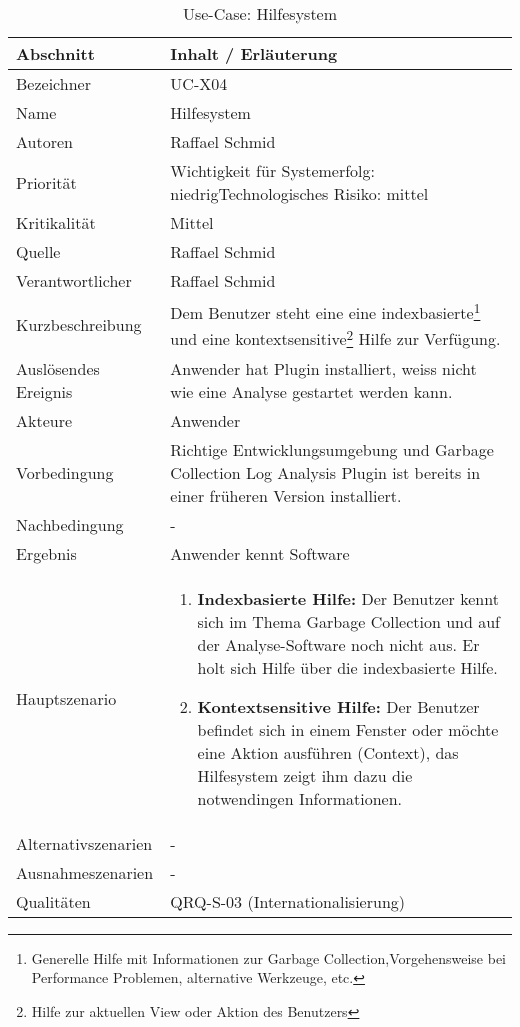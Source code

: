 \begin{longtable}{|p{4cm}|p{10.5cm}|}
\caption{Use-Case: Hilfesystem}\\\hline
   \textbf{Abschnitt} & \textbf{Inhalt / Erläuterung} \\\hline
   Bezeichner & UC-X04\\\hline
   Name & Hilfesystem\\\hline
   Autoren & Raffael Schmid\\\hline
   Priorität & Wichtigkeit für Systemerfolg: niedrig\newline Technologisches Risiko: mittel\\\hline
   Kritikalität & Mittel\\\hline
   Quelle & Raffael Schmid\\\hline
   Verantwortlicher & Raffael Schmid\\\hline
   Kurzbeschreibung & Dem Benutzer steht eine eine indexbasierte\footnote{Generelle Hilfe mit Informationen zur Garbage Collection,Vorgehensweise bei Performance Problemen, alternative Werkzeuge, etc.} und eine kontextsensitive\footnote{Hilfe zur aktuellen View oder Aktion des Benutzers} Hilfe zur Verfügung. \\\hline
   Auslösendes Ereignis & Anwender hat Plugin installiert, weiss nicht wie eine Analyse gestartet werden kann.\\\hline
   Akteure & Anwender\\\hline
   Vorbedingung & Richtige Entwicklungsumgebung und Garbage Collection Log Analysis Plugin ist bereits in einer früheren Version installiert.\\\hline
   Nachbedingung & -\\\hline
   Ergebnis & Anwender kennt Software\\\hline
   Hauptszenario &	\begin{enumerate}
		\item \textbf{Indexbasierte Hilfe: } Der Benutzer kennt sich im Thema Garbage Collection und auf der Analyse-Software noch nicht aus. Er holt sich Hilfe über die indexbasierte Hilfe. 
		\item \textbf{Kontextsensitive Hilfe: } Der Benutzer befindet sich in einem Fenster oder möchte eine Aktion ausführen (Context), das Hilfesystem zeigt ihm dazu die notwendingen Informationen.
	\end{enumerate}
	\\\hline
   Alternativszenarien & -\\\hline
   Ausnahmeszenarien & -\\\hline
   Qualitäten & QRQ-S-03 (Internationalisierung)\\\hline
\end{longtable}


